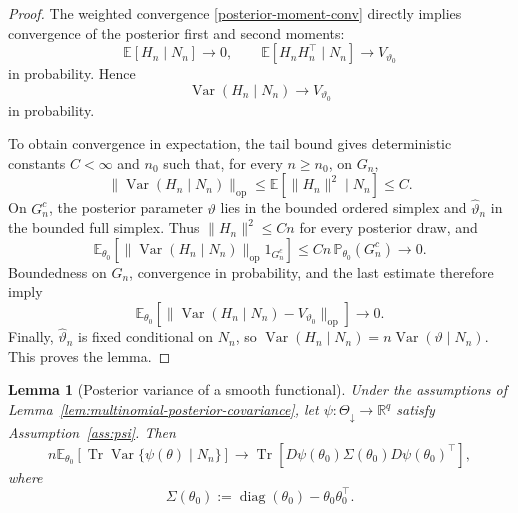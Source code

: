 \documentclass{article}
\newtheorem{lemma}[theorem]{Lemma}
\theoremstyle{named}
\theoremstyle{named1}
\theoremstyle{plain}
\theoremstyle{remark}
\begin{document}
\begin{proof}
The weighted convergence \eqref{posterior-moment-conv} directly implies
convergence of the posterior first and second moments:
\[
    \mathbb E[H_n\mid N_n]\rightarrow0,
    \qquad
    \mathbb E[H_nH_n^\top\mid N_n]\rightarrow V_{\vartheta_0}
\]
in probability. Hence
\begin{equation}
    \operatorname{Var}(H_n\mid N_n)
    \rightarrow V_{\vartheta_0}
    \label{eq:posterior-covariance-probability}
\end{equation}
in probability.

To obtain convergence in expectation, the tail bound gives deterministic
constants $C<\infty$ and $n_0$ such that, for every $n\geq n_0$, on $G_n$,
\[
    \|\operatorname{Var}(H_n\mid N_n)\|_{\mathrm{op}}
    \leq\mathbb E[\|H_n\|^2\mid N_n]\leq C.
\]
On $G_n^c$, the posterior parameter $\vartheta$ lies in the bounded
ordered simplex and $\widehat\vartheta_n$ in the bounded full simplex.
Thus $\|H_n\|^2\leq Cn$ for every posterior draw, and
\[
    \mathbb E_{\theta_0}\left[
        \|\operatorname{Var}(H_n\mid N_n)\|_{\mathrm{op}}
        1_{G_n^c}
    \right]
    \leq Cn\,\mathbb P_{\theta_0}(G_n^c)
    \rightarrow0.
\]
Boundedness on $G_n$, convergence in probability, and the last estimate
therefore imply
\[
    \mathbb E_{\theta_0}\left[
        \|\operatorname{Var}(H_n\mid N_n)-V_{\vartheta_0}\|_{\mathrm{op}}
    \right]\rightarrow0.
\]
Finally, $\widehat\vartheta_n$ is fixed conditional on $N_n$, so
$\operatorname{Var}(H_n\mid N_n)=n\operatorname{Var}(\vartheta\mid N_n)$.
This proves the lemma.
\end{proof}

\begin{lemma}[Posterior variance of a smooth functional]
\label{lem:multinomial-functional-posterior-variance}
Under the assumptions of
Lemma~\ref{lem:multinomial-posterior-covariance}, let
$\psi:\Theta_{\downarrow}\to\mathbb R^q$ satisfy
Assumption~\ref{ass:psi}. Then
\[
    n\mathbb E_{\theta_0}\left[
        \operatorname{Tr}\operatorname{Var}\{\psi(\theta)\mid N_n\}
    \right]
    \rightarrow
    \operatorname{Tr}\left[
        D\psi(\theta_0)\Sigma(\theta_0)D\psi(\theta_0)^\top
    \right],
\]
where
\[
    \Sigma(\theta_0)
    :=\operatorname{diag}(\theta_0)-\theta_0\theta_0^\top.
\]
\end{lemma}
\end{document}
